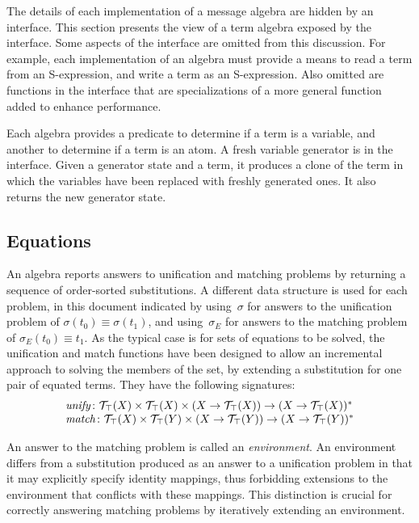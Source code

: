 \documentclass[12pt]{report}
\theoremstyle{definition}
\begin{document}
The details of each implementation of a {\cpsa} message algebra are
hidden by an interface.  This section presents the view of a term
algebra exposed by the interface.  Some aspects of the interface are
omitted from this discussion.  For example, each implementation of an
algebra must provide a means to read a term from an S-expression, and
write a term as an S-expression.  Also omitted are functions in the
interface that are specializations of a more general function added to
enhance performance.

Each algebra provides a predicate to determine if a term is a
variable, and another to determine if a term is an atom.  A fresh
variable generator is in the interface.  Given a generator state and a
term, it produces a clone of the term in which the variables have been
replaced with freshly generated ones.  It also returns the new
generator state.

\subsection{Equations}\label{sec:equations}

An algebra reports answers to unification and matching problems by
returning a sequence of order-sorted substitutions.  A
different data structure is used for each problem, in this document
indicated by using~$\sigma$ for answers to the unification problem of
$\sigma(t_0)\equiv\sigma(t_1)$, and using~$\sigma_E$ for answers to the
matching problem of $\sigma_E(t_0)\equiv t_1$.  As the typical case is for
sets of equations to be solved, the unification and match functions
have been designed to allow an incremental approach to solving the
members of the set, by extending a substitution for one pair of
equated terms.  They have the following signatures:
$$\begin{array}{l}
\operatorname{\mathit{unify}}\colon
\mathcal{T}_\top(X)\times\mathcal{T}_\top(X)\times
(X\rightarrow\mathcal{T}_\top(X))\rightarrow
(X\rightarrow\mathcal{T}_\top(X))^\ast\\
\operatorname{\mathit{match}}\colon
\mathcal{T}_\top(X)\times\mathcal{T}_\top(Y)\times
(X\rightarrow\mathcal{T}_\top(Y))\rightarrow
(X\rightarrow\mathcal{T}_\top(Y))^\ast
\end{array}$$

An answer to the matching problem is called an
\emph{environment}.  An environment differs from a
substitution produced as an answer to a unification problem in that it
may explicitly specify identity mappings, thus forbidding extensions
to the environment that conflicts with these mappings.  This
distinction is crucial for correctly answering matching problems by
iteratively extending an environment.
\end{document}
